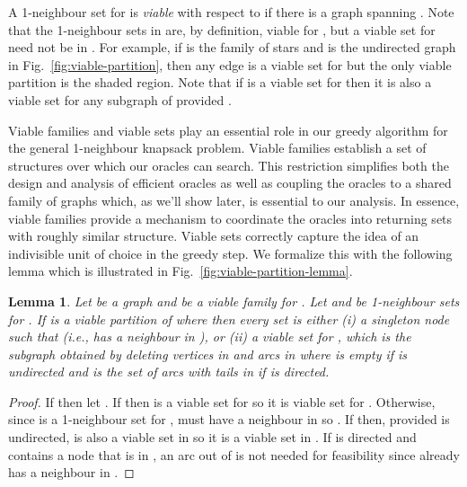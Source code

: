 \documentclass[12pt]{article}
\newtheorem{lemma}[theorem]{Lemma}
\begin{document}
A 1-neighbour set  for  is {\em viable} with respect to  if there is a graph  spanning . Note that the 1-neighbour sets in  are, by definition, viable for , but a viable set for  need not be in .  For example, if  is the family of stars and  is the undirected graph in Fig.~\ref{fig:viable-partition}, then any edge is a viable set for  but the only viable partition is the shaded region.  Note that if  is a viable set for  then it is also a viable set for any subgraph  of  provided .







Viable families and viable sets play an essential role in our greedy algorithm for the general 1-neighbour knapsack problem.  Viable families establish a set of structures over which our oracles can search.  This restriction simplifies both the design and analysis of efficient oracles as well as coupling the oracles to a shared family of graphs which, as we'll show later, is essential to our analysis.  In essence, viable families provide a mechanism to coordinate the oracles into returning sets with roughly similar structure.  Viable sets correctly capture the idea of an indivisible unit of choice in the greedy step.  We formalize this with the following lemma which is illustrated in Fig.~\ref{fig:viable-partition-lemma}.

\begin{lemma} \label{lemma:viable-correct} Let  be a graph and
 be a viable family for .  Let  and  be
1-neighbour sets for .  If  is a
viable partition of  where  then every set  is either (i) a singleton node 
such that  (i.e.,  has a neighbour in ),
or (ii) a viable set for , which is the subgraph obtained by deleting
vertices in  and arcs in  where  is empty if  is
undirected and  is the set of arcs with tails in 
if  is directed. 





\end{lemma}

\begin{proof}
If  then let .  If  then  is a
viable set for  so it is viable set for . Otherwise, since
 is a 1-neighbour set for ,  must have a neighbour in 
so .  If  then, provided  is
undirected,  is also a viable set in  so it is a viable set
in .  If  is directed and  contains a node  that is in
, an arc out of  is not needed for feasibility
since  already has a neighbour in .

\end{proof}
\end{document}
